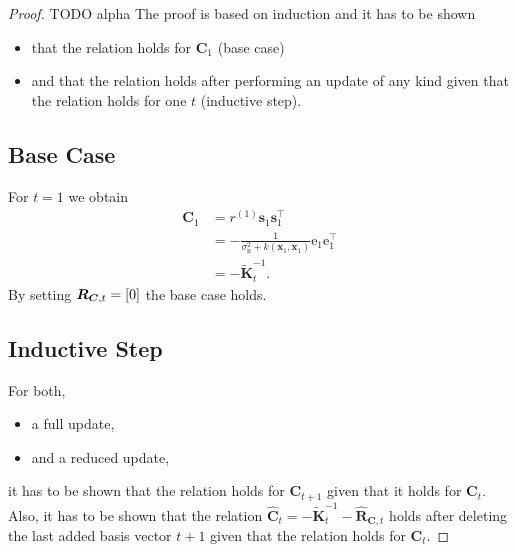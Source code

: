 \documentclass[11pt,a4paper,twoside,BCOR=15mm]{scrbook}
\newcommand{\vc}[1]{\bm{#1}}
\newcommand{\mat}[1]{\bm{#1}}
\newcommand{\Tr}{^{\top}}
\newcommand{\e}{\mathrm{e}}
\newcommand{\ped}[1]{_{\mathrm{#1}}}
\begin{document}
\begin{proof}
TODO alpha
The proof is based on induction and it has to be shown
\begin{itemize}
    \item that the relation holds for $\mat C_1$ (base case)
    \item and that the relation holds after performing an update of any kind 
        given that the relation holds for one $t$ (inductive step).
\end{itemize}

\subsection{Base Case}
For $t = 1$ we obtain
\begin{align*}
    \mat C_1 &= r^{(1)} \vc s_1 \vc s_1\Tr \\
    &= - \frac{1}{\sigma\ped{n}^2 + k(\vc x_1, \vc x_1)} \vc\e_1 \vc\e_1\Tr \\
    &= -\tilde{\mat K}_t^{-1} \text{.}
\end{align*}
By setting $\mat R_{\mat C, t} = \sbr{0}$ the base case holds.

\subsection{Inductive Step}
For both,
\begin{itemize}
    \item a full update,
    \item and a reduced update,
\end{itemize}
it has to be shown that the relation holds for $\mat C_{t+1}$ given that it 
holds for $\mat C_t$. Also, it has to be shown that the relation  
$\hat{\mat{C}}_t = - \tilde{\mat K}_t^{-1} - \hat{\mat R}_{\mat C, t}$ holds 
after deleting the last added basis vector $t+1$ given that the relation holds 
for $\mat C_t$.


\end{proof}
\end{document}
